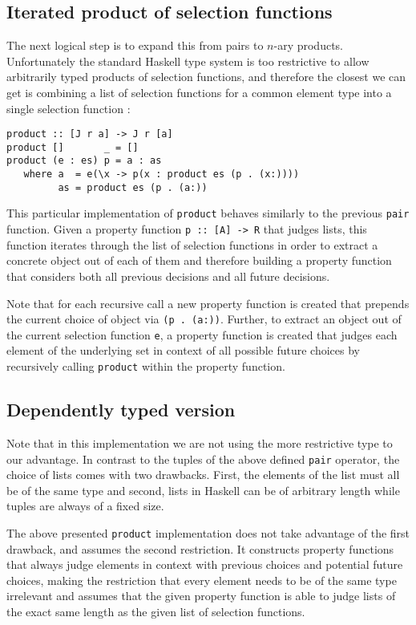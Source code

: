 \documentclass[runningheads]{llncs}
\begin{document}
\subsection{Iterated product of selection functions}
The next logical step is to expand this from pairs to $n$-ary products. Unfortunately the standard Haskell type system is too restrictive to allow arbitrarily typed products of selection functions, and therefore the closest we can get is combining a list of selection functions for a common element type into a single selection function \cite{escardo2010sequential}:
\begin{verbatim}
product :: [J r a] -> J r [a]
product []       _ = []
product (e : es) p = a : as
   where a  = e(\x -> p(x : product es (p . (x:))))
         as = product es (p . (a:))
\end{verbatim}
This particular implementation of \texttt{product} behaves similarly to the previous \texttt{pair} function. Given a property function \texttt{p :: [A] -> R} that judges lists, this function iterates through the list of selection functions in order to extract a concrete object out of each of them and therefore building a property function that considers both all previous decisions and all future decisions.

Note that for each recursive call a new property function is created that prepends the current choice of object via \texttt{(p . (a:))}. Further, to extract an object out of the current selection function \texttt{e}, a property function is created that judges each element of the underlying set in context of all possible future choices by recursively calling \texttt{product} within the property function.
%
%
%
\subsection{Dependently typed version}
Note that in this implementation we are not using the more restrictive type to our advantage. In contrast to the tuples of the above defined \texttt{pair} operator, the choice of lists comes with two drawbacks. First, the elements of the list must all be of the same type and second, lists in Haskell can be of arbitrary length while tuples are always of a fixed size. 

The above presented \texttt{product} implementation does not take advantage of the first drawback, and assumes the second restriction. It constructs property functions that always judge elements in context with previous choices and potential future choices, making the restriction that every element needs to be of the same type irrelevant and assumes that the given property function is able to judge lists of the exact same length as the given list of selection functions.
\end{document}
